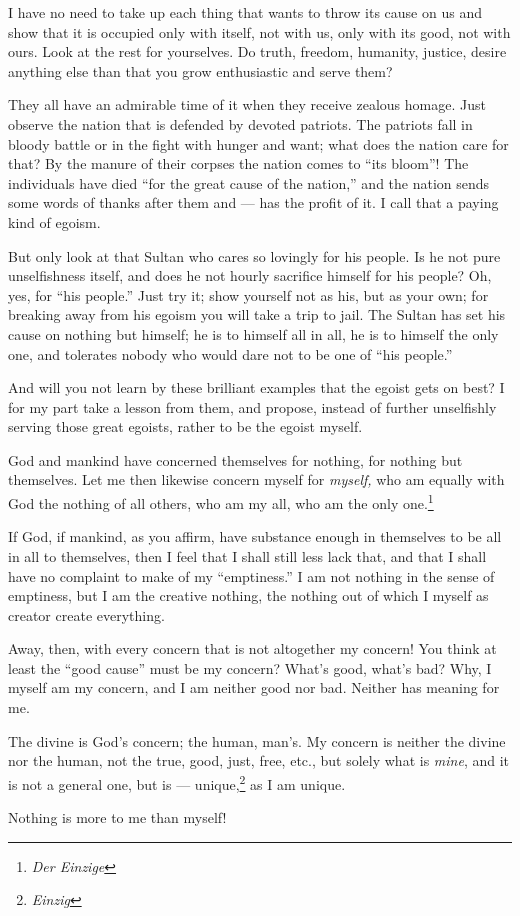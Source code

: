 I have no need to take up each thing that wants to throw its cause on us and 
show that it is occupied only with itself, not with us, only with its good, 
not with ours. Look at the rest for yourselves. Do truth, freedom, humanity, 
justice, desire anything else than that you grow enthusiastic and serve them?

They all have an admirable time of it when they receive zealous homage. Just 
observe the nation that is defended by devoted patriots. The patriots fall in 
bloody battle or in the fight with hunger and want; what does the nation care 
for that? By the manure of their corpses the nation comes to ``its bloom''! 
The individuals have died ``for the great cause of the nation,'' and the 
nation sends some words of thanks after them and --- has the profit of it. I 
call that a paying kind of egoism.

But only look at that Sultan who cares so lovingly for his people. Is he not 
pure unselfishness itself, and does he not hourly sacrifice himself for his 
people? Oh, yes, for ``his people.'' Just try it; show yourself not as his, 
but as your own; for breaking away from his egoism you will take a trip to 
jail. The Sultan has set his cause on nothing but himself; he is to himself 
all in all, he is to himself the only one, and tolerates nobody who would dare 
not to be one of ``his people.''

And will you not learn by these brilliant examples that the egoist gets on 
best? I for my part take a lesson from them, and propose, instead of further 
unselfishly serving those great egoists, rather to be the egoist myself.

God and mankind have concerned themselves for nothing, for nothing but 
themselves. Let me then likewise concern myself for \textit{myself,} who am 
equally with God the nothing of all others, who am my all, who am the only 
one.\footnote{\textit{Der Einzige}}

If God, if mankind, as you affirm, have substance enough in themselves to be 
all in all to themselves, then I feel that I shall still less lack that, and 
that I shall have no complaint to make of my ``emptiness.'' I am not nothing 
in the sense of emptiness, but I am the creative nothing, the nothing out of 
which I myself as creator create everything.

Away, then, with every concern that is not altogether my concern! You think at 
least the ``good cause'' must be my concern? What's good, what's bad? Why, I 
myself am my concern, and I am neither good nor bad. Neither has meaning for 
me.

The divine is God's concern; the human, man's. My concern is neither the 
divine nor the human, not the true, good, just, free, etc., but solely what is 
\textit{mine}, and it is not a general one, but is --- 
unique,\footnote{\textit{Einzig}} as I am unique.

Nothing is more to me than myself!

